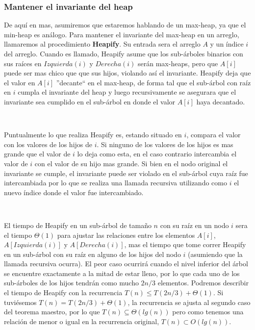\subsubsection{Mantener el invariante del heap}

De aqu\'i en mas, asumiremos que estaremos hablando de un max-heap, ya que el min-heap es an\'alogo. Para mantener el invariante del max-heap en un arreglo, llamaremos al procedimiento \textbf{Heapify}. Su entrada sera el arreglo $A$ y un \'indice $i$ del arreglo. Cuando es llamado, Heapify asume que los sub-\'arboles binarios con sus ra\'ices en $Izquierda(i)$ y $Derecha(i)$ ser\'an max-heaps, pero que $A[i]$ puede ser mas chico que que sus hijos, violando as\'i el invariante. Heapify deja que el valor en $A[i]$ ''decante`` en el max-heap, de forma tal que el sub-\'arbol con ra\'iz en $i$ cumpla el invariante del heap y luego recursivamente se asegurara que el invariante sea cumplido en el sub-\'arbol en donde el valor $A[i]$ haya decantado.

~

Puntualmente lo que realiza Heapify es, estando situado en $i$, compara el valor con los valores de los hijos de $i$. Si ninguno de los valores de los hijos es mas grande que el valor de $i$ lo deja como esta, en el caso contrario intercambia el valor de $i$ con el valor de su hijo mas grande. Si bien en el nodo original el invariante se cumple, el invariante puede ser violado en el sub-\'arbol cuya ra\'iz fue intercambiada por lo que se realiza una llamada recursiva utilizando como $i$ el nuevo \'indice donde el valor fue intercambiado.

~

El tiempo de Heapify en un sub-\'arbol de tama\~no $n$ con su ra\'iz en un nodo $i$ sera el tiempo $\Theta(1)$ para ajustar las relaciones entre los elementos $A[i]$, $A[Izquierda(i)]$ y $A[Derecha(i)]$, mas el tiempo que tome correr Heapify en un sub-\'arbol con su ra\'iz en alguno de los hijos del nodo $i$ (asumiendo que la llamada recursiva ocurra). El peor caso ocurrir\'a cuando el nivel inferior del \'arbol se encuentre exactamente a la mitad de estar lleno, por lo que cada uno de los sub-\'arboles de los hijos tendr\'an como mucho $2n/3$ elementos. Podremos describir el tiempo de Heapify con la recurrencia $T(n) \leq T(2n/3) + \Theta(1)$. Si tuvi\'esemos $T(n) = T(2n/3) + \Theta(1)$, la recurrencia se ajusta al segundo caso del teorema maestro, por lo que $T(n) \subseteq \Theta(lg(n))$ pero como tenemos una relaci\'on de menor o igual en la recurrencia original, $T(n) \subset O(lg(n))$.

